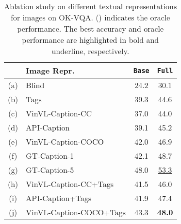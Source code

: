 \begin{table}[t]
\small
\centering
\vspace{-0.0in}
\begin{tabular}{ c l || c c}
    \hline
    & Image Repr. & \textbf{\texttt{Base}} & \textbf{\texttt{Full}} \\
    \hline
    (a) & Blind & 24.2 & 30.1 \\
    (b) & Tags & 39.3 & 44.6 \\
    (c) & VinVL-Caption-CC & 37.0 & 44.0 \\
    (d) & API-Caption & 39.1 & 45.2\\
    (e) & VinVL-Caption-COCO & 42.0 & 46.9 \\
    (f) & GT-Caption-1 & 42.1 & 48.7\\
    (g) & GT-Caption-5 & 48.0 & \underline{53.3} \\
    \hline
    (h) & VinVL-Caption-CC+Tags & 41.5 & 46.0 \\
    (i) & API-Caption+Tags & 41.9 & 47.4 \\
    (j) & VinVL-Caption-COCO+Tags & 43.3 & \textbf{48.0}\\
    \hline
\end{tabular}
\vspace{-2mm}
\caption{\small Ablation study on different textual representations for images on OK-VQA. () indicates the oracle performance. The best accuracy and oracle performance are highlighted in bold and underline, respectively.}
\vspace{-2mm}
\label{table:content}
\end{table}


